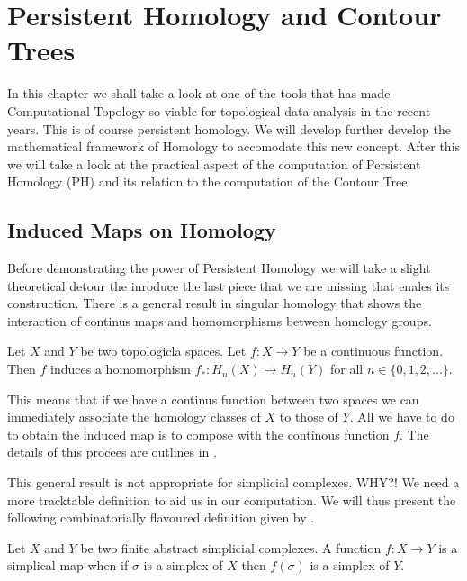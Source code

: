 \chapter{Persistent Homology and Contour Trees}
\label{chapter4}

In this chapter we shall take a look at one of the tools that has made Computational Topology so viable for topological data analysis in the recent years. This is of course persistent homology. We will develop further develop the mathematical framework of Homology to accomodate this new concept. After this we will take a look at the practical aspect of the computation of Persistent Homology (PH) and its relation to the computation of the Contour Tree.

\section{Induced Maps on Homology}

Before demonstrating the power of Persistent Homology we will take a slight theoretical detour the inroduce the last piece that we are missing that enales its construction. There is a general result in singular homology that shows the interaction of continus maps and homomorphisms between homology groups.

\begin{defn} Let $X$ and $Y$ be two topologicla spaces. Let $f: X \to Y$ be a continuous function. Then $f$ induces a homomorphism $f_*: H_n(X) \to H_n(Y)$ for all $n \in \{0, 1, 2, ...\}$. \end{defn}

This means that if we have a continus function between two spaces we can immediately associate the homology classes of $X$ to those of $Y$. All we have to do to obtain the induced map is to compose with the continous function $f$. The details of this procees are outlines in \cite{algebraic-topology}.


This general result is not appropriate for simplicial complexes. WHY?! We need a more tracktable definition to aid us in our computation. We will thus present the following combinatorially flavoured definition given by \cite{combinatorial-algebraic-topology}. 


\begin{defn} Let $X$ and $Y$ be two finite abstract simplicial complexes. A function $f: X \to Y$ is a simplical map when if $\sigma$ is a simplex of $X$ then $f(\sigma)$ is a simplex of $Y$. \end{defn}

